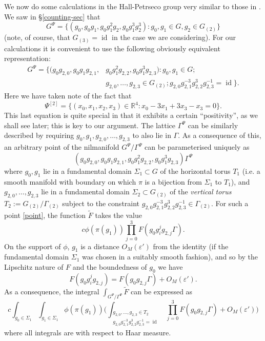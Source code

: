\documentclass[11pt,reqno]{amsart}
\numberwithin{equation}{section}
\theoremstyle{plain}
\theoremstyle{definition}
\newcommand\R{\mathbb{R}}
\newcommand\1{{\bf 1}}
\newcommand\2{{\bf 2}}
\newcommand\eps{\varepsilon}
\newcommand\id{\operatorname{id}}
\begin{document}
We now do some calculations in the Hall-Petrseco group very similar to those in \cite{bergelson-host-kra}. We saw in \S \ref{counting-sec} that
\[ G^{\Psi} = \{ (g_0, g_0 g_1 , g_0 g_1^2 g_2, g_0 g_1^3 g_2^3) : g_0 , g_1 \in G, g_2 \in G_{(2)}\} \] (note, of course, that $G_{(3)} = \id$ in the case we are considering).
For our calculations it is convenient to use the following obviously equivalent representation:
\begin{align*} G^{\Psi} = \{ (g_0 g_{2,0}, g_0 g_1 g_{2,1}, &  g_0 g_1^2 g_{2,2}, g_0 g_1^3 g_{2,3}): g_0,g_1 \in G; \\ &  g_{2,0},\ldots,g_{2,3} \in G_{(2)}; g_{2,0} g_{2,1}^{-3} g_{2,2}^3 g_{2,3}^{-1} = \id \}.\end{align*}
Here we have taken note of the fact that 
\[ \Psi^{[2]} = \{ (x_0, x_1, x_2, x_3) \in \R^4 : x_0 - 3x_1 + 3x_3 - x_3 = 0\}.\] This last equation is quite special in that it exhibits a certain ``positivity'', as we shall see later; this is key to our argument. 
The lattice $\Gamma^{\Psi}$ can be similarly described by requiring $g_0, g_1, g_{2,0},\ldots,g_{2,3}$ to also lie in $\Gamma$.  As a consequence of this, an arbitrary point of the nilmanifold $G^{\Psi}/\Gamma^{\Psi}$ can be parameterised uniquely as
\begin{equation}\label{point}
 (g_0 g_{2,0}, g_0 g_1 g_{2,1}, g_0 g_1^2 g_{2,2}, g_0 g_1^3 g_{2,3}) \Gamma^{\Psi}
\end{equation}
where $g_0, g_1$ lie in a fundamental domain $\Sigma_1 \subset G$ of the horizontal torus $T_1$ (i.e. a smooth manifold with boundary on which $\pi$ is a bijection from $\Sigma_1$ to $T_1$), and $g_{2,0},\ldots,g_{2,3}$ lie in a fundamental domain $\Sigma_2 \subset G_{(2)}$ of the \emph{vertical torus} $T_2 := G_{(2)} / \Gamma_{(2)}$ subject to the constraint $g_{2,0} g_{2,1}^{-3} g_{2,2}^3 g_{2,3}^{-1} \in \Gamma_{(2)}$.  For such a point \eqref{point}, the function $\tilde F$ takes the value
$$ c \phi( \pi(g_1) ) \prod_{j=0}^3 F( g_0 g_i^j g_{2,j} \Gamma ).$$
On the support of $\phi$, $g_1$ is a distance $O_M(\eps')$ from the identity (if the fundamental domain $\Sigma_1$ was chosen in a suitably smooth fashion), and so by the Lipschitz nature of $F$ and the boundedness of $g_0$ we have
$$ F( g_0 g_i^j g_{2,j} ) = F( g_0 g_{2,j} \Gamma ) + O_M(\eps').$$
As a consequence, the integral $\int_{G^{\Psi}/\Gamma^{\Psi}} \tilde F$ can be expressed as
\begin{equation}\label{lam}
c \int_{g_0 \in \Sigma_1} \int_{g_1 \in \Sigma_1} \phi(\pi(g_1)) \big( \int_{\substack{g_{2,0},\ldots,g_{2,3} \in T_2\\ g_{2,0} g_{2,1}^{-3} g_{2,2}^3 g_{2,3}^{-1}=\id}} \prod_{j=0}^3 F( g_0 g_{2,j} \Gamma ) + O_M(\eps')\big)
\end{equation}
where all integrals are with respect to Haar measure.
\end{document}
